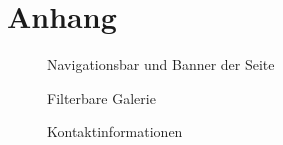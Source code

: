 \chapter{Anhang}
\begin{figure}[!h]
	\caption{Navigationsbar und Banner der Seite}
	\label{fig:navbarBanner}
\end{figure}

\begin{figure}[!h]
	\caption{Filterbare Galerie}
	\label{fig:gallery}
\end{figure}

\begin{figure}[!h]
	\caption{Kontaktinformationen}
	\label{fig:contact}
\end{figure}

